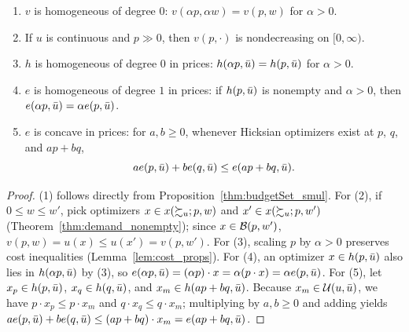\begin{proposition}
\label{thm:ve_props}
\leanok
{}
\begin{enumerate}
  \item $v$ is homogeneous of degree $0$: $v(\alpha p, \alpha w) = v(p, w)$ for $\alpha > 0$.
  \item If $u$ is continuous and $p \gg 0$, then $v(p, \cdot)$ is nondecreasing on $[0, \infty)$.
  \item $h$ is homogeneous of degree $0$ in prices: $h(\alpha p, \bar{u}) = h(p, \bar{u})$ for $\alpha > 0$.
  \item $e$ is homogeneous of degree $1$ in prices: if $h(p, \bar{u})$ is nonempty and $\alpha > 0$,
        then $e(\alpha p, \bar{u}) = \alpha e(p, \bar{u})$.
  \item $e$ is concave in prices: for $a, b \ge 0$, whenever Hicksian optimizers exist at
        $p$, $q$, and $ap + bq$,
        \[
          a e(p, \bar{u}) + b e(q, \bar{u}) \le e(ap + bq, \bar{u}).
        \]
\end{enumerate}
\end{proposition}
\begin{proof}
\leanok
(1) follows directly from Proposition~\ref{thm:budgetSet_smul}.
For (2), if $0 \le w \le w'$, pick optimizers $x \in x(\succsim_u; p, w)$ and
$x' \in x(\succsim_u; p, w')$ (Theorem~\ref{thm:demand_nonempty}); since $x \in \mathcal{B}(p, w')$,
$v(p, w) = u(x) \le u(x') = v(p, w')$.
For (3), scaling $p$ by $\alpha > 0$ preserves cost inequalities (Lemma~\ref{lem:cost_props}).
For (4), an optimizer $x \in h(p, \bar{u})$ also lies in $h(\alpha p, \bar{u})$ by (3), so
$e(\alpha p, \bar{u}) = (\alpha p) \cdot x = \alpha(p \cdot x) = \alpha e(p, \bar{u})$.
For (5), let $x_p \in h(p, \bar{u})$, $x_q \in h(q, \bar{u})$, and $x_m \in h(ap + bq, \bar{u})$.
Because $x_m \in \mathcal{U}(u, \bar{u})$, we have $p \cdot x_p \le p \cdot x_m$ and
$q \cdot x_q \le q \cdot x_m$; multiplying by $a, b \ge 0$ and adding yields
$a e(p, \bar{u}) + b e(q, \bar{u}) \le (ap + bq) \cdot x_m = e(ap + bq, \bar{u})$.
\end{proof}

